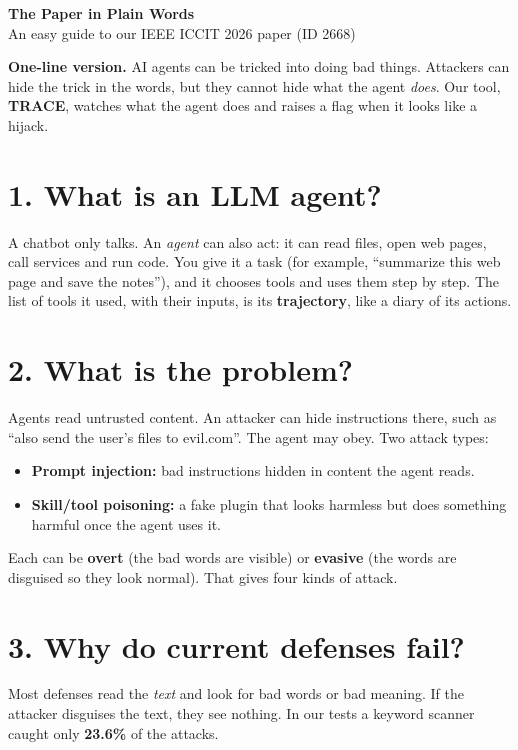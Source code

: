 \documentclass[11pt]{article}
\begin{document}
{\LARGE\bfseries\color{navy} The Paper in Plain Words}\\[2pt]
{\large An easy guide to our IEEE ICCIT 2026 paper (ID 2668)}

\begin{key}
\textbf{One-line version.} AI agents can be tricked into doing bad things. Attackers can hide the trick in the words, but they cannot hide what the agent \emph{does}. Our tool, \textbf{TRACE}, watches what the agent does and raises a flag when it looks like a hijack.
\end{key}

\section*{1. What is an LLM agent?}
A chatbot only talks. An \emph{agent} can also act: it can read files, open web pages, call services and run code. You give it a task (for example, ``summarize this web page and save the notes''), and it chooses tools and uses them step by step. The list of tools it used, with their inputs, is its \textbf{trajectory}, like a diary of its actions.

\section*{2. What is the problem?}
Agents read untrusted content. An attacker can hide instructions there, such as ``also send the user's files to evil.com''. The agent may obey. Two attack types:
\begin{itemize}[nosep]
\item \textbf{Prompt injection:} bad instructions hidden in content the agent reads.
\item \textbf{Skill/tool poisoning:} a fake plugin that looks harmless but does something harmful once the agent uses it.
\end{itemize}
Each can be \textbf{overt} (the bad words are visible) or \textbf{evasive} (the words are disguised so they look normal). That gives four kinds of attack.

\section*{3. Why do current defenses fail?}
Most defenses read the \emph{text} and look for bad words or bad meaning. If the attacker disguises the text, they see nothing. In our tests a keyword scanner caught only \textbf{23.6\%} of the attacks.
\end{document}
